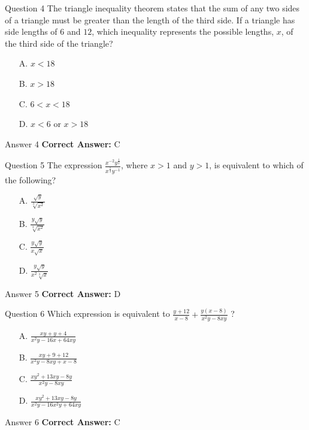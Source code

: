 \documentclass{beamer}
\begin{document}
\begin{frame}{Question 4}
\small
The triangle inequality theorem states that the sum of any two sides of a triangle must be greater than the length of the third side. If a triangle has side lengths of $6$ and $12$, which inequality represents the possible lengths, $x$, of the third side of the triangle?
\vspace{0.35cm}
\begin{enumerate}
    \item[A.] $x < 18$
    \item[B.] $x > 18$
    \item[C.] $6 < x < 18$
    \item[D.] $x < 6 \text{ or } x > 18$
\end{enumerate}
\end{frame}
\begin{frame}{Answer 4}
\small
\textbf{Correct Answer:} C
\end{frame}

\begin{frame}{Question 5}
\small
The expression \(\frac{x^{-2}y^{\frac{1}{2}}}{x^{\frac{1}{3}}y^{-1}}\), where \(x > 1\) and \(y > 1\), is equivalent to which of the following?
\vspace{0.35cm}
\begin{enumerate}
    \item[A.] \(\frac{\sqrt{y}}{\sqrt[3]{x^2}}\)
    \item[B.] \(\frac{y\sqrt{y}}{\sqrt[3]{x^{2}}}\)
    \item[C.] \(\frac{y\sqrt{y}}{x\sqrt{x}}\)
    \item[D.] \(\frac{y\sqrt{y}}{x^{2}\sqrt[3]{x}}\)
\end{enumerate}
\end{frame}
\begin{frame}{Answer 5}
\small
\textbf{Correct Answer:} D
\end{frame}

\begin{frame}{Question 6}
\small
Which expression is equivalent to \(\frac{y + 12}{x - 8} + \frac{y(x - 8)}{x^2 y - 8xy}\) ?
\vspace{0.35cm}
\begin{enumerate}
    \item[A.] \(\frac{xy + y + 4}{x^2 y - 16x + 64xy}\)
    \item[B.] \(\frac{xy + 9 + 12}{x^2 y - 8xy + x - 8}\)
    \item[C.] \(\frac{xy^2 + 13xy - 8y}{x^2 y - 8xy}\)
    \item[D.] \(\frac{xy^2 + 13xy - 8y}{x^2 y - 16x^2 y + 64xy}\)
\end{enumerate}
\end{frame}
\begin{frame}{Answer 6}
\small
\textbf{Correct Answer:} C
\end{frame}
\end{document}
